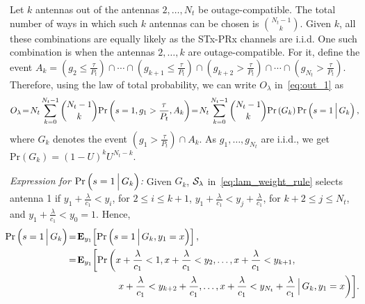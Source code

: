 \documentclass[12pt,draftcls,peerreview,onecolumn]{IEEEtran}
\newcommand{\brac}[1]{\left({#1}\right)}
\newcommand{\prob}[1]{\text{Pr}\brac{#1}}
\newcommand{\Given}{\Big\arrowvert}
\newcommand{\nck}[2]{\binom{#1}{#2}}
\newcommand{\setA}{A}
\newcommand{\setAk}{\setA_{k}}
\newcommand{\setG}{G}
\newcommand{\setGk}{\setG_k}
\newcommand{\lam}{\lambda}
\newcommand{\Nt}{{N_t}}
\newcommand{\Pt}{{P_t}}
\newcommand{\puch}{g}
\newcommand{\gk}[1]{{\puch_{#1}}}
\newcommand{\itau}{\tau}
\newcommand{\cone}{c_{1}}
\newcommand{\out}{O}
\newcommand{\taubypt}{\frac{\itau}{\Pt}}
\newcommand{\gkgrtaubypt}[1]{{\gk{#1}}>\taubypt}
\newcommand{\gklttaubypt}[1]{{\gk{#1}}\leq\taubypt}
\newcommand{\lambym}{\frac{\lam}{\cone}}
\newcommand{\yk}[1]{y_{#1}}
\newcommand{\ykplambym}[1]{\yk{#1}+\lambym}
\newcommand{\xplambym}{x+\lambym}
\newcommand{\un}{U}
\newcommand{\callamrule}{{\cal S_{{\lam}}}}
\newcommand{\outlam}{\out_{\lam}}
\begin{document}
Let $k$ antennas out of the antennas $2,\ldots,\Nt$ be outage-compatible. The total number of ways in which such $k$ antennas can be chosen is $\nck{\Nt-1}{k}$. Given $k$, all these combinations are equally likely as the STx-PRx channels are i.i.d. One such combination is when the antennas $2,\ldots,k$ are outage-compatible. For it, define the event   $\setAk=\left(\gklttaubypt{2}\right)\cap\cdots\cap\left(\gklttaubypt{k+1}\right)\cap\left( \gkgrtaubypt{k+2}\right)\cap\cdots\cap\left(\gkgrtaubypt{\Nt}\right)$. Therefore, using the law of total probability, we can write $\outlam$ in~\eqref{eq:out_1} as
%
\begin{equation}
\outlam \!=\!\Nt\sum_{k=0}^{\Nt-1}\nck{\Nt-1}{k} \text{Pr}\brac{s = 1,\gk{1}>\taubypt,\setAk} \!=\!\Nt\sum_{k=0}^{\Nt-1}\nck{\Nt-1}{k}  \text{Pr}\brac{\setGk} \text{Pr}\brac{s = 1\Given \setGk},
\label{eq:out_3}
\end{equation}
%
where $\setGk$ denotes the event  $\left(\gkgrtaubypt{1}\right)\cap\setAk $. As $\gk{1},\ldots,\gk{\Nt}$ are i.i.d., we get $\prob{\setGk} = \left(1-\un\right)^k\un^{\Nt-k}$.
%

{\em Expression for $\prob{s = 1\Given\setGk}$:} Given $\setGk$, $\callamrule$ in~\eqref{eq:lam_weight_rule} selects antenna 1 if $\ykplambym{1}<\yk{i}$, for $2\leq i \leq k+1$,  $\ykplambym{1}<\ykplambym{j}$, for $k+2\leq j \leq \Nt$, and $\ykplambym{1}<\yk{0}=1$. Hence,
%
\begin{align}
\label{eq:out_5}
\!\!\!\prob{s = 1\Given \setGk }&\!=\!{\bf{E}}_{\yk{1}}\!\left[\prob{s = 1\Given\setGk,\yk{1}=x}\right] ,\\
\label{eq:out_51}
&\!=\!{\bf{E}}_{\yk{1}}\!\left[\text{Pr}\left(\xplambym < 1, \xplambym<\yk{2}, \dots ,\xplambym<\yk{k+1},\right.\right.\nonumber\\
&\quad\quad\quad\quad\quad\left.\left.
\xplambym<\ykplambym{k+2}, \dots ,\xplambym < \ykplambym{\Nt}\Given\setGk,\yk{1}=x\right)\right]\!.
\end{align} 
%
\end{document}
